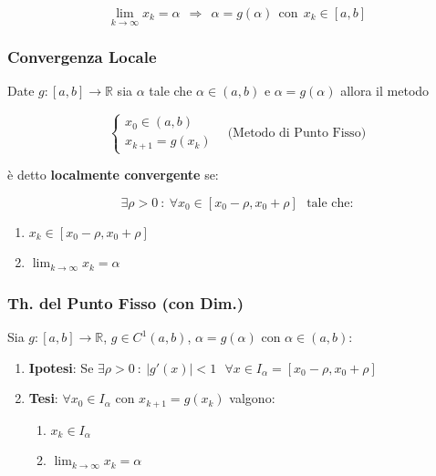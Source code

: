 \documentclass{article}
\begin{document}
\[ \lim_{k \rightarrow \infty} x_{k} = \alpha \:\: \Rightarrow \:\: \alpha = g(\alpha) \:\: \text{con} \:\: x_{k} \in [a,b] \]

\subsubsection{Convergenza Locale}

Date $g:[a,b] \rightarrow \mathbb{R}$ sia $\alpha$ tale che $\alpha \in (a,b)$ e $\alpha = g(\alpha)$ allora il metodo

\[ 
\left\{ \begin{array}{rcl}
    x_{0} \in (a,b) \\
    x_{k+1} = g(x_{k})
    \end{array}\right.
    \:\:\:\: \text{(Metodo di Punto Fisso)} 
\]

è detto \textbf{localmente convergente} se:

\vspace*{-8px}

\[ \exists \rho > 0 \: : \: \forall x_{0} \in [x_{0}-\rho,x_{0}+\rho] \:\:\: \text{tale che:} \]

\begin{enumerate}
    \item $x_{k} \in [x_{0}-\rho,x_{0}+\rho]$
    \item $\lim_{k \rightarrow \infty} x_{k} = \alpha$
\end{enumerate}

\subsubsection{Th. del Punto Fisso (con Dim.)}

Sia $g:[a,b] \rightarrow \mathbb{R}$, $g \in C^{1}(a,b)$, $\alpha = g(\alpha)$ con $\alpha \in (a,b)$:

\begin{enumerate}
    \item \textbf{Ipotesi}: Se $\exists \rho > 0 \: : \: |g'(x)| < 1 \:\:\: \forall x \in I_{\alpha} = [x_{0}-\rho,x_{0}+\rho]$
    \item \textbf{Tesi}: $\forall x_{0} \in I_{\alpha}$ con $x_{k+1} = g(x_{k})$ valgono:
    \begin{enumerate}
        \item $x_{k} \in I_{\alpha}$
        \item $\lim_{k \rightarrow \infty} x_{k} = \alpha$
    \end{enumerate}
\end{enumerate}
\end{document}
